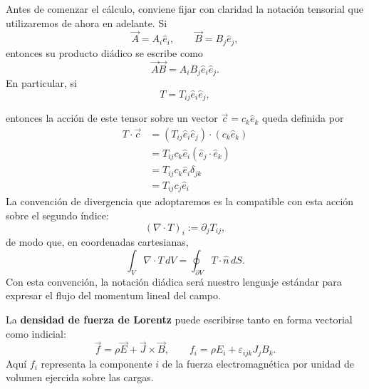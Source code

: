 \documentclass[12pt,a4paper]{article}
\theoremstyle{definition}
\theoremstyle{plain}
\numberwithin{equation}{section}
\theoremstyle{remark}
\newcommand{\E}{\vec{E}}
\newcommand{\B}{\vec{B}}
\newcommand{\J}{\vec{J}}
\begin{document}
Antes de comenzar el cálculo, conviene fijar con claridad la notación tensorial que utilizaremos de ahora en adelante. Si
\begin{equation*}
    \vec A=A_i\hat e_i,
    \qquad
    \vec B=B_j\hat e_j,
\end{equation*}
entonces su producto diádico se escribe como
\begin{equation*}
    \vec A\vec B=A_iB_j\hat e_i\hat e_j.
\end{equation*}
En particular, si
\begin{equation*}
   T=T_{ij}\hat e_i\hat e_j,
\end{equation*}

entonces la acción de este tensor sobre un vector $\vec c=c_k\hat e_k$ queda definida por
\begin{align*}
    T\cdot\vec c&=(T_{ij}\hat e_i\hat e_j)\cdot (c_k\hat e_k)\\
    &=T_{ij}c_k\hat e_i(\hat e_j\cdot \hat e_k)\\
    &=T_{ij}c_k\hat e_i\delta_{jk} \\
    &=T_{ij}c_j\hat e_i
\end{align*}
La convención de divergencia que adoptaremos es la compatible con esta acción sobre el segundo índice:
\begin{equation*}
    (\nabla\cdot T)_i:=\partial_jT_{ij},
\end{equation*}
de modo que, en coordenadas cartesianas,
\begin{equation*}
    \int_V \nabla\cdot T\,dV=\oint_{\partial V}T\cdot\hat n\,dS.
\end{equation*}
Con esta convención, la notación diádica será nuestro lenguaje estándar para expresar el flujo del momentum lineal del campo.

La \textbf{densidad de fuerza de Lorentz} puede escribirse tanto en forma vectorial como indicial:
\begin{equation}
    \vec f=\rho\E+\J\times\B,
    \qquad
    f_i=\rho E_i+\varepsilon_{ijk}J_jB_k.
    \label{eq:momentum-lorentz-density}
\end{equation}
Aquí $f_i$ representa la componente $i$ de la fuerza electromagnética por unidad de volumen ejercida sobre las cargas.
\end{document}

